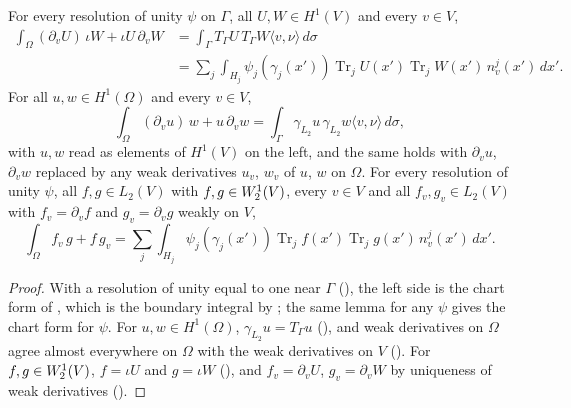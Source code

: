 \begin{theorem}
\label{thm:domain-green}
\leanok
{}
For every resolution of unity $\psi$ on $\Gamma$, all $U, W \in H^1(V)$ and every $v \in V$,
\begin{align*}
  \int_\Omega (\partial_v U) \, \iota W + \iota U \, \partial_v W
  &= \int_\Gamma T_\Gamma U \, T_\Gamma W \langle v, \nu \rangle \, d\sigma \\
  &= \sum_j \int_{H_j} \psi_j(\gamma_j(x')) \operatorname{Tr}_j U(x') \operatorname{Tr}_j W(x') \,
    n^j_v(x') \, dx' .
\end{align*}
For all $u, w \in H^1(\Omega)$ and every $v \in V$,
\[
  \int_\Omega (\partial_v u) \, w + u \, \partial_v w
  = \int_\Gamma \gamma_{L_2} u \, \gamma_{L_2} w \langle v, \nu \rangle \, d\sigma ,
\]
with $u, w$ read as elements of $H^1(V)$ on the left, and the same holds with $\partial_v u$,
$\partial_v w$ replaced by any weak derivatives $u_v$, $w_v$ of $u$, $w$ on $\Omega$. For every
resolution of unity $\psi$, all
$f, g \in L_2(V)$ with $f, g \in W^{1}_{2}(V)$, every $v \in V$ and all $f_v, g_v \in L_2(V)$ with
$f_v = \partial_v f$ and $g_v = \partial_v g$ weakly on $V$,
\[
  \int_\Omega f_v \, g + f \, g_v
  = \sum_j \int_{H_j} \psi_j(\gamma_j(x')) \operatorname{Tr}_j f(x') \operatorname{Tr}_j g(x') \,
    n^j_v(x') \, dx' .
\]
\end{theorem}

\begin{proof}
\leanok
With a resolution of unity equal to one near $\Gamma$ (), the
left side is the chart form of , which is the boundary integral
by ; the same lemma for any $\psi$ gives the chart form for
$\psi$. For $u, w \in H^1(\Omega)$, $\gamma_{L_2} u = T_\Gamma u$ (), and
weak derivatives on $\Omega$ agree almost everywhere on $\Omega$ with the weak derivatives on $V$
(). For $f, g \in W^{1}_{2}(V)$, $f = \iota U$ and
$g = \iota W$ (), and $f_v = \partial_v U$,
$g_v = \partial_v W$
by uniqueness of weak derivatives ().
\end{proof}

